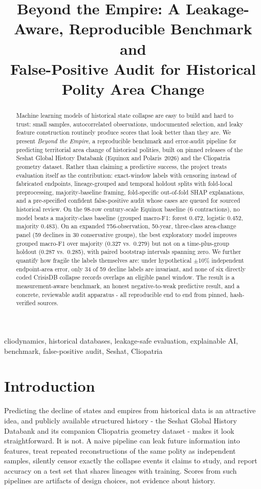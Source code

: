 \documentclass[conference]{IEEEtran}
\title{Beyond the Empire: A Leakage-Aware, Reproducible Benchmark and\\
False-Positive Audit for Historical Polity Area Change}
\author{
\IEEEauthorblockN{Shailesh Mishra, [Teammate 2], [Teammate 3], [Teammate 4]}
\IEEEauthorblockA{Department of Computer Science and Engineering\\
PES University, Bengaluru, India\\
7.shaileshmishra@gmail.com}
}
\begin{document}
\maketitle

\begin{abstract}
Machine learning models of historical state collapse are easy to build and hard to
trust: small samples, autocorrelated observations, undocumented selection, and
leaky feature construction routinely produce scores that look better than they are.
We present \emph{Beyond the Empire}, a reproducible benchmark and error-audit
pipeline for predicting territorial area change of historical polities, built on
pinned releases of the Seshat Global History Databank (Equinox and Polaris~2026)
and the Cliopatria geometry dataset. Rather than claiming a predictive success,
the project treats evaluation itself as the contribution: exact-window labels with
censoring instead of fabricated endpoints, lineage-grouped and temporal holdout
splits with fold-local preprocessing, majority-baseline framing, fold-specific
out-of-fold SHAP explanations, and a pre-specified confident false-positive audit
whose cases are queued for sourced historical review. On the 98-row century-scale
Equinox baseline (6 contractions), no model beats a majority-class baseline
(grouped macro-F1: forest 0.472, logistic 0.452, majority 0.483). On an expanded
756-observation, 50-year, three-class area-change panel (59 declines in 30
conservative groups), the best exploratory model improves grouped macro-F1 over
majority (0.327 vs.\ 0.279) but not on a time-plus-group holdout (0.287 vs.\
0.285), with paired bootstrap intervals spanning zero. We further quantify how
fragile the labels themselves are: under hypothetical $\pm$10\% independent
endpoint-area error, only 34 of 59 decline labels are invariant, and none of six
directly coded CrisisDB collapse records overlaps an eligible panel window. The
result is a measurement-aware benchmark, an honest negative-to-weak predictive
result, and a concrete, reviewable audit apparatus - all reproducible end to end
from pinned, hash-verified sources.
\end{abstract}

\begin{IEEEkeywords}
cliodynamics, historical databases, leakage-safe evaluation, explainable AI,
benchmark, false-positive audit, Seshat, Cliopatria
\end{IEEEkeywords}

\section{Introduction}
Predicting the decline of states and empires from historical data is an
attractive idea, and publicly available structured history - the Seshat Global
History Databank and its companion Cliopatria geometry dataset - makes it look
straightforward. It is not. A naive pipeline can leak future information into
features, treat repeated reconstructions of the same polity as independent
samples, silently censor exactly the collapse events it claims to study, and
report accuracy on a test set that shares lineages with training. Scores from
such pipelines are artifacts of design choices, not evidence about history.
\end{document}
